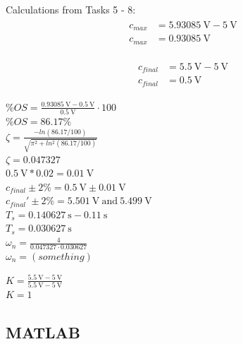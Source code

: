 \documentclass[a4paper,12pt]{article}
\begin{document}
Calculations from Tasks 5 - 8:
\begin{align}
\begin{split}\label{eq:1}
	c_{max} &={} \SI{5.93085}{\volt} - \SI{5}{\volt} \\
	c_{max} &={} \SI{0.93085}{\volt}
\end{split}
\end{align}

\begin{align}
\begin{split}\label{eq:2}
	c_{final} &= \SI{5.5}{\volt} - \SI{5}{\volt} \\
	c_{final} &= \SI{0.5}{\volt}
\end{split}	
\end{align} 

$\%OS = \frac{\SI{0.93085}{\volt}-\SI{0.5}{\volt}}{\SI{0.5}{\volt}} \cdot 100$\\

$\%OS =  86.17\%$\\

$\zeta = \frac{-ln(86.17/100)}{\sqrt{\pi^2+ln^2(86.17/100)}}$\\

$\zeta = 0.047327$\\

$\SI{0.5}{\volt}*0.02 = \SI{0.01}{\volt}$\\
 
$c_{final}\pm 2\% = \SI{0.5}{\volt} \pm\SI{0.01}{\volt}$\\
 
$c_{final}'\pm 2\% = \SI{5.501}{\volt} \:\textrm{and} \: \SI{5.499}{\volt}$\\
 
$T_s = \SI{0.140627}{\second} - \SI{0.11}{\second}$\\
 
$T_s = \SI{0.030627}{\second}$\\

$\omega_n  = \frac{4}{0.047327 \cdot 0.030627}$\\

$\omega_n  = (something) $

$K = \frac{\SI{5.5}{\volt} - \SI{5}{\volt}}{\SI{5.5}{\volt} - \SI{5}{\volt}}$\\
 
$K = 1$

\subsection{MATLAB}
\end{document}
